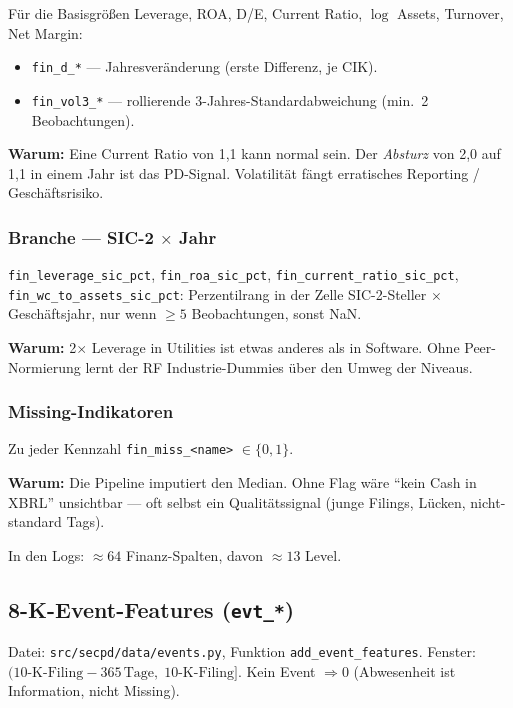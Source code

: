 \documentclass[11pt,a4paper]{article}
\newcommand{\file}[1]{\texttt{\small #1}}
\begin{document}
Für die Basisgrößen Leverage, ROA, D/E, Current Ratio, $\log$ Assets, Turnover,
Net Margin:

\begin{itemize}[leftmargin=1.2em]
  \item \texttt{fin\_d\_*} --- Jahresveränderung (erste Differenz, je CIK).
  \item \texttt{fin\_vol3\_*} --- rollierende 3-Jahres-Standardabweichung
        (min.\ 2 Beobachtungen).
\end{itemize}

\textbf{Warum:} Eine Current Ratio von 1{,}1 kann normal sein. Der \emph{Absturz}
von 2{,}0 auf 1{,}1 in einem Jahr ist das PD-Signal. Volatilität fängt
erratisches Reporting / Geschäftsrisiko.

\subsubsection{Branche --- SIC-2 $\times$ Jahr}

\texttt{fin\_leverage\_sic\_pct}, \texttt{fin\_roa\_sic\_pct},
\texttt{fin\_current\_ratio\_sic\_pct}, \texttt{fin\_wc\_to\_assets\_sic\_pct}:
Perzentilrang in der Zelle SIC-2-Steller $\times$ Geschäftsjahr, nur wenn
$\ge 5$ Beobachtungen, sonst NaN.

\textbf{Warum:} 2$\times$ Leverage in Utilities ist etwas anderes als in Software.
Ohne Peer-Normierung lernt der RF Industrie-Dummies über den Umweg der Niveaus.

\subsubsection{Missing-Indikatoren}

Zu jeder Kennzahl \texttt{fin\_miss\_<name>} $\in\{0,1\}$.

\textbf{Warum:} Die Pipeline imputiert den Median. Ohne Flag wäre ``kein Cash
in XBRL'' unsichtbar --- oft selbst ein Qualitätssignal (junge Filings, Lücken,
nicht-standard Tags).

In den Logs: $\approx 64$ Finanz-Spalten, davon $\approx 13$ Level.

\subsection{8-K-Event-Features (\texttt{evt\_*})}

Datei: \file{src/secpd/data/events.py}, Funktion \texttt{add\_event\_features}.
Fenster: $(\text{10-K-Filing}-365\,\text{Tage},\;\text{10-K-Filing}]$.
Kein Event $\Rightarrow 0$ (Abwesenheit ist Information, nicht Missing).
\end{document}
